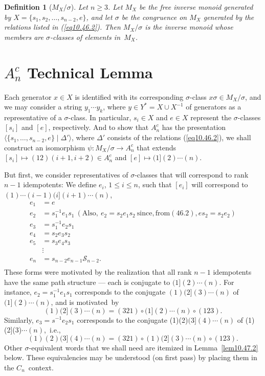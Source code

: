 \documentclass{surv-l}
\numberwithin{equation}{section}
\numberwithin{table}{section}
\numberwithin{figure}{section}
\theoremstyle{plain}
\newtheorem{definition}[equation]{Definition}
\theoremstyle{definition}
\begin{document}
\begin{definition}[$M_{X}/\sigma$]\label{defn10.46.3}
Let $n \geq 3$. Let $M_{X}$ be the free inverse monoid generated
by $X=\{s_{1}, s_{2},\ldots, s_{n-2}, e\}$, and let $\sigma$ be
the congruence on $M_{X}$ generated by the relations listed in
\emph{(\ref{eq10.46.2})}. Then $M_{X}/\sigma$ is the inverse monoid whose
members are $\sigma$-classes of elements in~$M_{X}$.
\end{definition}

\section{$A_{n}^{c}$ Technical Lemma}\label{sec10.47}

Each generator $x\in X$ is identified with its corresponding
$\sigma$-class $x\sigma\in M_{X}/\sigma$, and we may consider a
string $y_{1}\cdots y_{k}$, where $y\in Y^{\ast}=X\cup X^{-1}$ of
generators as a representative of a $\sigma$-class. In particular,
$s_{i}\in X$ and $e\in X$ represent the $\sigma$-classes $[s_{i}]$
and $[e]$, respectively. And to show that $A_{n}^{c}$ has the
presentation $\langle\{s_{1},\ldots, s_{n-2},
e\}\mid \Delta'\rangle$, where $\Delta'$ consists of
the relations (\ref{eq10.46.2}), we shall construct an isomorphism
$\psi : M_{X}/\sigma\rightarrow A_{n}^{c}$ that extends
$[s_{i}]\mapsto(12)(i+1, i+2)\in A_{n}^{c}$ and
$[e]\mapsto(1](2)\cdots(n)$.

But first, we consider representatives of $\sigma$-classes that
will correspond to rank $n-1$ idempotents: We define $e_{i}$, $1\leq
i\leq n$, such that $[e_{i}]$ will correspond to $(1)\cdots
(i-1)(i](i+1)\cdots(n)$,
\begin{equation}
\begin{split}
e_{1}&=e \\
e_{2}&=s_{1}^{-1}e_{1}s_{1}\ (\mathrm{Also,}\
e_{2}=s_{2}e_{1}s_{2}\ \mathrm{since, from (46.2)}, es_{2}=s_{2}e_{2}) \\
e_{3}&=s_{1}^{-1} e_{2}s_{1} \\
e_{4} &=s_{2}e_{3}s_{2} \label{eq10.47.1}\\
e_{5}&=s_{3}e_{4}s_{3} \\
&\vdots \\
e_{n} &=s_{n-2}e_{n-1}\mathcal{S}_{n-2}.\\
\end{split}
\end{equation}
These forms were motivated by the realization that all rank $n-1$
idempotents have the same path structure --- each is conjugate to
$(1](2)\cdots(n)$. For instance, $e_{2}=s_{1}^{-1}e_{1}s_{1}$
corresponds to the conjugate $(1)(2](3)\cdots(n)$ of
$(1](2)\cdots(n)$, and is motivated~by
\[
(1)(2](3)\cdots(n)=(321)\circ(1](2)\cdots(n)\circ (123).
\]
Similarly, $e_{3}=s^{-1}e_{2}s_{1}$ corresponds to the conjugate
(1)(2)$(3](4)\cdots(n)$ of (1)(2](3)$\cdots (n)$,~i.e.,
\[
(1)(2)(3](4)\cdots(n)=(321)\circ (1)(2](3)\cdots(n)\circ (123).
\]
Other $\sigma$-equivalent words that we shall need are itemized in
Lemma~\ref{lem10.47.2} below. These equivalencies may be
understood (on first pass) by placing them in the $C_{n}$~context.
\end{document}
